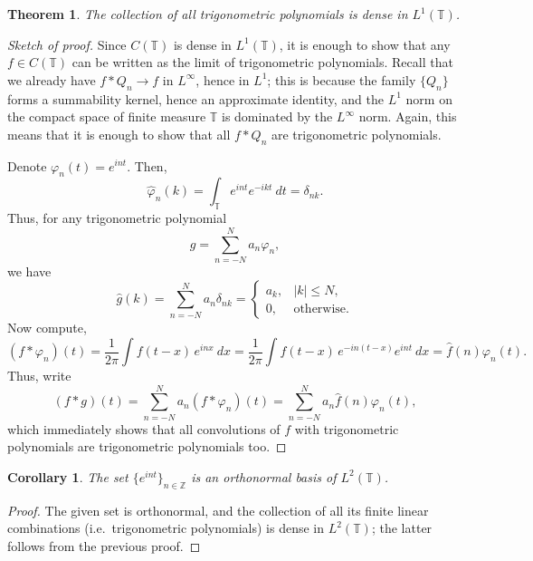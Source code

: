 \documentclass[11pt]{article}
\newtheorem*{theorem}{Theorem}
\newtheorem*{corollary}{Corollary}
\theoremstyle{definition}
\theoremstyle{remark}
\begin{document}
    \begin{theorem}
        The collection of all trigonometric polynomials is dense in
        $L^1(\mathbb{T})$.
    \end{theorem}
    \begin{proof}[Sketch of proof]
        Since $C(\mathbb{T})$ is dense in $L^1(\mathbb{T})$, it is enough to show
        that any $f \in C(\mathbb{T})$ can be written as the limit of trigonometric
        polynomials. Recall that we already have $f * Q_n \to f$ in $L^\infty$, hence
        in $L^1$; this is because the family $\{Q_n\}$ forms a summability kernel,
        hence an approximate identity, and the $L^1$ norm on the compact space of
        finite measure $\mathbb{T}$ is dominated by the $L^\infty$ norm. Again, this
        means that it is enough to show that all $f * Q_n$ are trigonometric
        polynomials.

        Denote $\varphi_n(t) = e^{int}$. Then, \[
            \hat{\varphi}_n(k) = \int_{\mathbb{T}} e^{int} e^{-ikt} \:dt =
            \delta_{nk}.
        \] Thus, for any trigonometric polynomial \[
            g = \sum_{n = -N}^N a_n\varphi_n,
        \] we have \[
            \hat{g}(k) = \sum_{n = -N}^N a_n\delta_{nk} = \begin{cases}
                a_k, & |k| \leq N, \\
                0, & \text{otherwise}.
            \end{cases}
        \] Now compute, \[
            (f * \varphi_n)(t) = \frac{1}{2\pi} \int f(t - x)\, e^{inx}\:dx =
            \frac{1}{2\pi} \int f(t - x)\, e^{-in(t - x)} e^{int}\:dx =
            \hat{f}(n)\varphi_n(t).
        \] Thus, write \[
            (f * g)(t) = \sum_{n = -N}^N a_n (f * \varphi_n)(t) =
            \sum_{n = -N}^N a_n \hat{f}(n) \varphi_n(t),
        \] which immediately shows that all convolutions of $f$ with trigonometric
        polynomials are trigonometric polynomials too.
    \end{proof}

    \begin{corollary}
        The set $\{e^{int}\}_{n \in \mathbb{Z}}$ is an orthonormal basis of
        $L^2(\mathbb{T})$.
    \end{corollary}
    \begin{proof}
        The given set is orthonormal, and the collection of all its finite linear
        combinations (i.e.\ trigonometric polynomials) is dense in $L^2(\mathbb{T})$;
        the latter follows from the previous proof.
    \end{proof}
\end{document}
